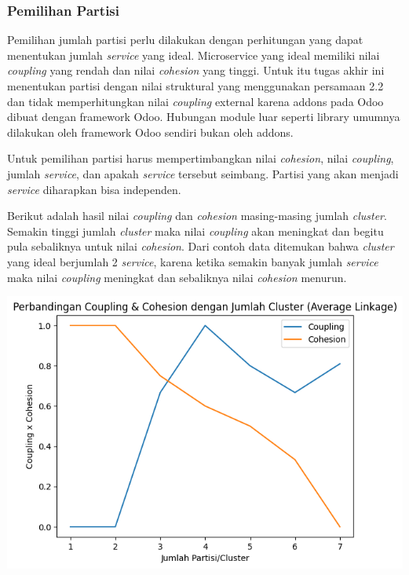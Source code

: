 \subsubsection{Pemilihan Partisi}
Pemilihan jumlah partisi perlu dilakukan dengan perhitungan yang dapat menentukan jumlah \textit{service} yang ideal. Microservice yang ideal memiliki nilai \textit{coupling} yang rendah dan nilai \textit{cohesion} yang tinggi. Untuk itu tugas akhir ini menentukan partisi dengan nilai struktural yang menggunakan persamaan 2.2 dan tidak memperhitungkan nilai \textit{coupling} external karena addons pada Odoo dibuat dengan framework Odoo. Hubungan module luar seperti library umumnya dilakukan oleh framework Odoo sendiri bukan oleh addons.

Untuk pemilihan partisi harus mempertimbangkan nilai \textit{cohesion}, nilai \textit{coupling}, jumlah \textit{service}, dan apakah \textit{service} tersebut seimbang. Partisi yang akan menjadi \textit{service} diharapkan bisa independen. 

Berikut adalah hasil nilai \textit{coupling} dan \textit{cohesion} masing-masing jumlah \textit{cluster}. Semakin tinggi jumlah \textit{cluster} maka nilai \textit{coupling} akan meningkat dan begitu pula sebaliknya untuk nilai \textit{cohesion}. Dari contoh data ditemukan bahwa \textit{cluster} yang ideal berjumlah 2 \textit{service}, karena ketika semakin banyak jumlah \textit{service} maka nilai \textit{coupling} meningkat dan sebaliknya nilai \textit{cohesion} menurun.

\begin{center}
	\includegraphics[width=14cm]{img/bab_3/cohVScoup.png}
	\label{fig:asd}
\end{center}


